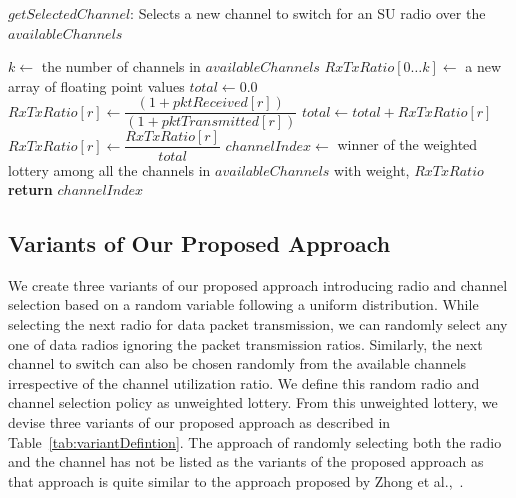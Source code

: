\documentclass[letterpaper,conference]{IEEEtran}
\begin{document}
\begin{algorithm}
\caption{$\mathit{getSelectedChannel}$: Selects a new channel to switch for an SU radio over the $\mathit{availableChannels}$}
\label{alg:getSelectedRadio}
\begin{algorithmic}[1]
\State $k \gets$ the number of channels in $\mathit{availableChannels}$
\State $\mathit{RxTxRatio} [0\ldots k] \gets $ a new array of floating point values
\State $\mathit{total} \gets 0.0$
\State $\mathit{RxTxRatio}[r] \gets \dfrac{(1+\mathit{pktReceived}[\mathit{r}])}{(1+\mathit{pktTransmitted}[\mathit{r}])}$
\State $\mathit{total} \gets \mathit{total} + \mathit{RxTxRatio}[r]$
\EndFor
{}
\State $\mathit{RxTxRatio}[r] \gets \dfrac{\mathit{RxTxRatio}[r]}{\mathit{total}}$
\EndFor
\State $\mathit{channelIndex} \gets$ winner of the weighted lottery among all the channels in $\mathit{availableChannels}$ with weight, $\mathit{RxTxRatio}$
\State \textbf{return} $\mathit{channelIndex}$
\EndFunction
\end{algorithmic}
\end{algorithm}

\vspace{-0.2cm}
\subsection{Variants of Our Proposed Approach}

We create three variants of our proposed approach introducing radio and channel selection based on a random variable following a uniform distribution. While selecting the next radio for data packet transmission, we can randomly select any one of data radios ignoring the packet transmission ratios. Similarly, the next channel to switch can also be chosen randomly from the available channels irrespective of the channel utilization ratio. We define this random radio and channel selection policy as unweighted lottery. From this unweighted lottery, we devise three variants of our proposed approach as described in Table~\ref{tab:variantDefintion}. The approach of randomly selecting both the radio and the channel has not be listed as the variants of the proposed approach as that approach is quite similar to the approach proposed by Zhong et al.,~\cite{zhong2014capacity}.
\end{document}
